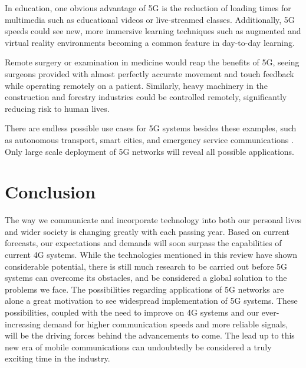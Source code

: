 \documentclass[journal]{IEEEtran}
\begin{document}
In education, one obvious advantage of 5G is the reduction of loading times for multimedia such as educational videos or live-streamed classes. Additionally, 5G speeds could see new, more immersive learning techniques such as augmented and virtual reality environments becoming a common feature in day-to-day learning.

Remote surgery or examination in medicine would reap the benefits of 5G, seeing surgeons provided with almost perfectly accurate movement and touch feedback while operating remotely on a patient. \cite{wp5g} Similarly, heavy machinery in the construction and forestry industries could be controlled remotely, significantly reducing risk to human lives.

There are endless possible use cases for 5G systems besides these examples, such as autonomous transport, smart cities, and emergency service communications \cite{wp5g}. Only large scale deployment of 5G networks will reveal all possible applications.

\section{Conclusion}
The way we communicate and incorporate technology into both our personal lives and wider society is changing greatly with each passing year. Based on current forecasts, our expectations and demands will soon surpass the capabilities of current 4G systems. While the technologies mentioned in this review have shown considerable potential, there is still much research to be carried out before 5G systems can overcome its obstacles, and be considered a global solution to the problems we face. The possibilities regarding applications of 5G networks are alone a great motivation to see widespread implementation of 5G systems. These possibilities, coupled with the need to improve on 4G systems and our ever-increasing demand for higher communication speeds and more reliable signals, will be the driving forces behind the advancements to come. The lead up to this new era of mobile communications can undoubtedly be considered a truly exciting time in the industry.

\bigskip
\bigskip

\printbibliography
\end{document}
